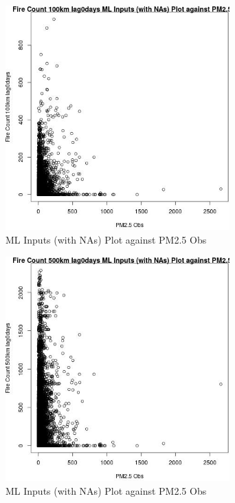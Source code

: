 \begin{figure} 
\centering  
\includegraphics[width=0.77\textwidth]{Code_Outputs/Report_ML_input_PM25_Step4_part_e_de_duplicated_aves_compiled_2019-05-20wNAs_Fire_Count_100km_lag0daysvPM25_Obs.jpg} 
\caption{\label{fig:Report_ML_input_PM25_Step4_part_e_de_duplicated_aves_compiled_2019-05-20wNAsFire_Count_100km_lag0daysvPM25_Obs}ML Inputs (with NAs) Plot against PM2.5 Obs} 
\end{figure} 
 

\begin{figure} 
\centering  
\includegraphics[width=0.77\textwidth]{Code_Outputs/Report_ML_input_PM25_Step4_part_e_de_duplicated_aves_compiled_2019-05-20wNAs_Fire_Count_500km_lag0daysvPM25_Obs.jpg} 
\caption{\label{fig:Report_ML_input_PM25_Step4_part_e_de_duplicated_aves_compiled_2019-05-20wNAsFire_Count_500km_lag0daysvPM25_Obs}ML Inputs (with NAs) Plot against PM2.5 Obs} 
\end{figure} 
 

